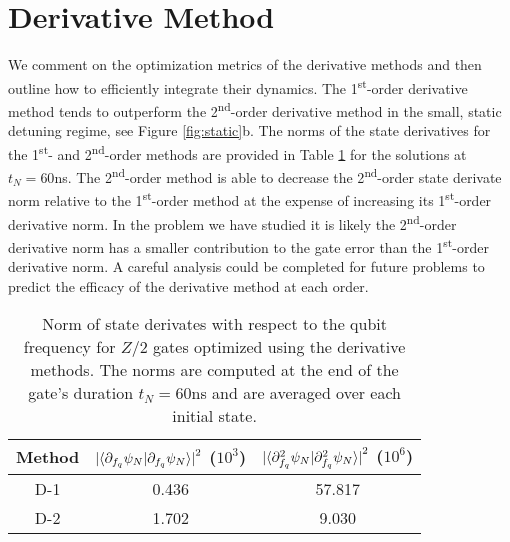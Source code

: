 \section{Derivative Method}
\label{appendix:derivative}
We comment on the optimization metrics of the derivative methods and then
outline how to efficiently integrate their dynamics.
The 1\textsuperscript{st}-order derivative method tends
to outperform the 2\textsuperscript{nd}-order
derivative method in the small, static detuning regime, see Figure \ref{fig:static}b.
The norms of the state derivatives for the 1\textsuperscript{st}- and 2\textsuperscript{nd}-order
methods are provided in Table \ref{tab:dnorm} for the solutions at $t_{N} = 60$ns.
The 2\textsuperscript{nd}-order method is able to decrease the 2\textsuperscript{nd}-order
state derivate norm relative to the 1\textsuperscript{st}-order method at the expense of increasing
its 1\textsuperscript{st}-order derivative norm. In the problem
we have studied it is likely the 2\textsuperscript{nd}-order derivative norm has a smaller
contribution to the gate error than the 1\textsuperscript{st}-order derivative norm. A
careful analysis could be completed for future problems to predict the efficacy of the
derivative method at each order.

\begin{table}[h]
  \begin{tabular}{c | c | c}
    Method & ${\lvert \braket{\partial_{f_{q}} \psi_{N} | \partial_{f_{q}} \psi_{N}} \rvert}^{2}$ ($10^{3}$)
    & ${\lvert \braket{\partial^{2}_{f_{q}} \psi_{N} | \partial^{2}_{f_{q}} \psi_{N}} \rvert}^{2}$ ($10^{6}$)\\
    \hline
    D-1 & 0.436 & 57.817\\
    D-2 & 1.702 & 9.030\\
  \end{tabular}
  \caption{Norm of state derivates with respect to the qubit frequency
    for $Z/2$ gates optimized using the derivative methods. The norms are computed
    at the end of the gate's duration $t_{N} = 60$ns and are averaged over each initial state.}
  \label{tab:dnorm}
\end{table}

